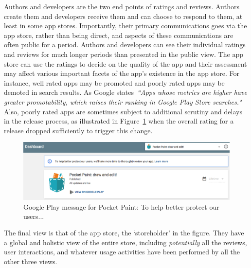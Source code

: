 Authors and developers are the two end points of ratings and reviews. Authors create them and developers receive them and can choose to respond to them, at least in some app stores.
Importantly, their primary communications goes via the app store, rather than being direct, and aspects of these communications are often public for a period. Authors and developers can see their individual ratings and reviews for much longer periods than presented in the public view. The app store can use the ratings to decide on the quality of the app and their assessment may affect various important facets of the app's existence in the app store. For instance, well rated apps may be promoted and poorly rated apps may be demoted in search results. As Google states~\emph{``Apps whose metrics are higher have greater promotability, which raises their ranking in Google Play Store searches."}~ Also, poorly rated apps are sometimes subject to additional scrutiny and delays in the release process, as illustrated in Figure~\ref{fig:pocketpaint-to-help-better-protect-users} when the overall rating for a release dropped sufficiently to trigger this change. %

\begin{figure}
    \includegraphics[width=\linewidth]{images/android-vitals-screenshots/catrobat/pocketpaint-to-help-better-protect-users.pdf}
    \caption{Google Play message for Pocket Paint: To help better protect our users...}
    \label{fig:pocketpaint-to-help-better-protect-users}
\end{figure}

The final view is that of the app store, the `storeholder' in the figure. They have a global and holistic view of the entire store, including \textit{potentially} all the reviews, user interactions, and whatever usage activities have been performed by all the other three views. 

